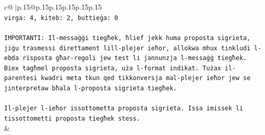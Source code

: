 \documentclass{article}
\begin{document}
{\begin{supertabular}{c@{$\;$}|p{.15\linewidth}@{}p{.15\linewidth}p{.15\linewidth}p{.15\linewidth}p{.15\linewidth}p{.15\linewidth}}
{{{\\ 
\texttt{virga: 4, kiteb: 2, buttieġa: 0} \\
\\ 
\texttt{IMPORTANTI: Il{-}messaġġi tiegħek, ħlief jekk huma proposta sigrieta, jiġu trasmessi direttament lill{-}plejer ieħor, allokwa mhux tinkludi l{-}ebda risposta għar{-}regoli jew test li jannunzja l{-}messaġġ tiegħek. Biex tagħmel proposta sigrieta, uża l{-}format indikat. Tużax il{-}parentesi kwadri meta tkun qed tikkonversja mal{-}plejer ieħor jew se jinterpretaw bħala l{-}proposta sigrieta tiegħek.} \\
\\ 
\texttt{Il{-}plejer l{-}ieħor issottometta proposta sigrieta. Issa imissek li tissottometti proposta tiegħek stess.} \\
            }
        }
    }
    & \\ \\


\end{supertabular}}
\end{document}
